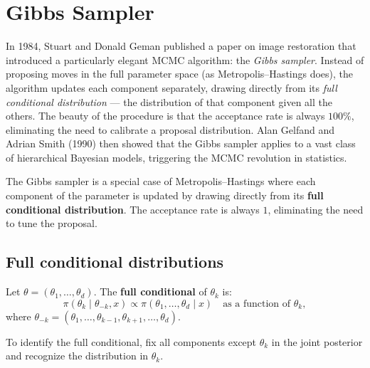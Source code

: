 \chapter{Gibbs Sampler}
\label{ch:gibbs}

In 1984, Stuart and Donald Geman published a paper on image restoration that introduced a particularly elegant MCMC algorithm: the \emph{Gibbs sampler}. Instead of proposing moves in the full parameter space (as Metropolis--Hastings does), the algorithm updates each component separately, drawing directly from its \emph{full conditional distribution} --- the distribution of that component given all the others. The beauty of the procedure is that the acceptance rate is always $100\%$, eliminating the need to calibrate a proposal distribution. Alan Gelfand and Adrian Smith (1990) then showed that the Gibbs sampler applies to a vast class of hierarchical Bayesian models, triggering the MCMC revolution in statistics.

\begin{intuition}[title=\textbf{Central idea}]
The Gibbs sampler is a special case of Metropolis--Hastings where each
component of the parameter is updated by drawing directly from its
\textbf{full conditional distribution}. The acceptance rate is always
$1$, eliminating the need to tune the proposal.
\end{intuition}

\section{Full conditional distributions}

\begin{definition}
Let $\theta = (\theta_1, \ldots, \theta_d)$. The \textbf{full
conditional} of $\theta_k$ is:
\[
  \pi(\theta_k \mid \theta_{-k}, x)
  \propto \pi(\theta_1, \ldots, \theta_d \mid x)
  \quad \text{as a function of } \theta_k,
\]
where $\theta_{-k} = (\theta_1, \ldots, \theta_{k-1}, \theta_{k+1}, \ldots, \theta_d)$.
\end{definition}

\begin{remark}
To identify the full conditional, fix all components except $\theta_k$
in the joint posterior and recognize the distribution in $\theta_k$.
\end{remark}

